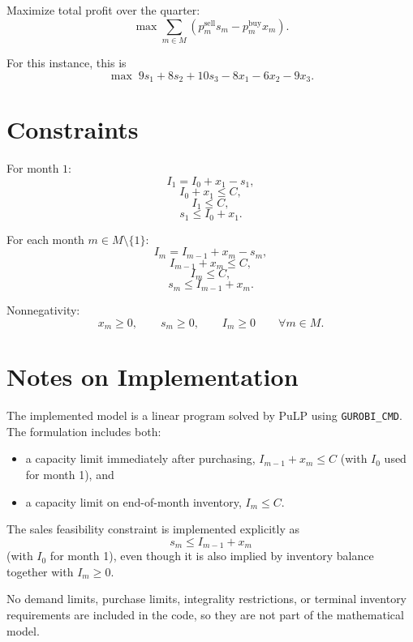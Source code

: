 Maximize total profit over the quarter:
\[
\max \sum_{m \in M} \left(p_m^{\text{sell}} s_m - p_m^{\text{buy}} x_m\right).
\]

For this instance, this is
\[
\max \; 9s_1+8s_2+10s_3-8x_1-6x_2-9x_3.
\]

\section*{Constraints}

For month $1$:
\[
I_1 = I_0 + x_1 - s_1,
\]
\[
I_0 + x_1 \le C,
\]
\[
I_1 \le C,
\]
\[
s_1 \le I_0 + x_1.
\]

For each month $m \in M \setminus \{1\}$:
\[
I_m = I_{m-1} + x_m - s_m,
\]
\[
I_{m-1} + x_m \le C,
\]
\[
I_m \le C,
\]
\[
s_m \le I_{m-1} + x_m.
\]

Nonnegativity:
\[
x_m \ge 0,\qquad s_m \ge 0,\qquad I_m \ge 0 \qquad \forall m \in M.
\]

\section*{Notes on Implementation}

The implemented model is a linear program solved by PuLP using \texttt{GUROBI\_CMD}. The formulation includes both:
\begin{itemize}
    \item a capacity limit immediately after purchasing, $I_{m-1}+x_m \le C$ (with $I_0$ used for month 1), and
    \item a capacity limit on end-of-month inventory, $I_m \le C$.
\end{itemize}

The sales feasibility constraint is implemented explicitly as
\[
s_m \le I_{m-1}+x_m
\]
(with $I_0$ for month 1), even though it is also implied by inventory balance together with $I_m \ge 0$.

No demand limits, purchase limits, integrality restrictions, or terminal inventory requirements are included in the code, so they are not part of the mathematical model.
